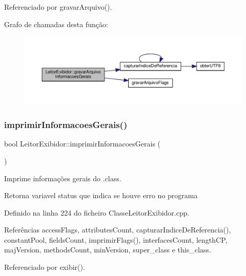 Referenciado por gravar\+Arquivo().

Grafo de chamadas desta função\+:
\nopagebreak
\begin{figure}[H]
\begin{center}
\leavevmode
\includegraphics[width=350pt]{classLeitorExibidor_ab65aba73916cc733df269b3033522a3c_cgraph}
\end{center}
\end{figure}
\mbox{\label{classLeitorExibidor_a338627a08235ffe50ede3d9e023c1238}} 
\subsubsection{\texorpdfstring{imprimir\+Informacoes\+Gerais()}{imprimirInformacoesGerais()}}
{\footnotesize\ttfamily bool Leitor\+Exibidor\+::imprimir\+Informacoes\+Gerais (\begin{DoxyParamCaption}{ }\end{DoxyParamCaption})}



Imprime informações gerais do .class. 

\begin{DoxyReturn}{Retorna}
variavel status que indica se houve erro no programa 
\end{DoxyReturn}


Definido na linha 224 do ficheiro Classe\+Leitor\+Exibidor.\+cpp.



Referências access\+Flags, attributes\+Count, capturar\+Indice\+De\+Referencia(), constant\+Pool, fields\+Count, imprimir\+Flags(), interfaces\+Count, length\+CP, maj\+Version, methods\+Count, min\+Version, super\+\_\+class e this\+\_\+class.



Referenciado por exibir().

